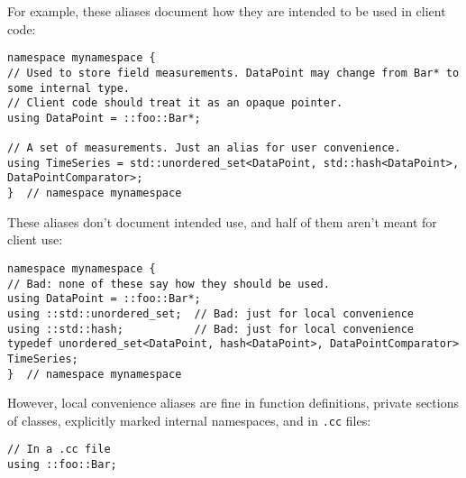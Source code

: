 For example, these aliases document how they are intended to be used in client code:
\begin{verbatim}
namespace mynamespace {
// Used to store field measurements. DataPoint may change from Bar* to some internal type.
// Client code should treat it as an opaque pointer.
using DataPoint = ::foo::Bar*;

// A set of measurements. Just an alias for user convenience.
using TimeSeries = std::unordered_set<DataPoint, std::hash<DataPoint>, DataPointComparator>;
}  // namespace mynamespace
\end{verbatim}
These aliases don't document intended use, and half of them aren't meant for client use:
\begin{verbatim}
namespace mynamespace {
// Bad: none of these say how they should be used.
using DataPoint = ::foo::Bar*;
using ::std::unordered_set;  // Bad: just for local convenience
using ::std::hash;           // Bad: just for local convenience
typedef unordered_set<DataPoint, hash<DataPoint>, DataPointComparator> TimeSeries;
}  // namespace mynamespace
\end{verbatim}
However, local convenience aliases are fine in function definitions, private sections of classes, explicitly marked internal namespaces, and in \texttt{.cc} files:
\begin{verbatim}
// In a .cc file
using ::foo::Bar;
\end{verbatim}